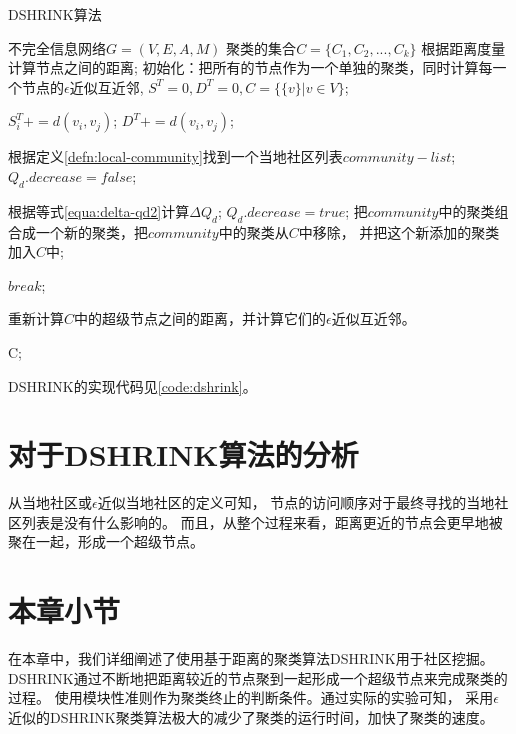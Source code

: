 \begin{algorithm}[htb]
    \caption{DSHRINK算法}
    \label{algo:dshrink}
    \begin{algorithmic}[1]
        \Require
        不完全信息网络$G = (V, E, A, M)$
        \Ensure
        聚类的集合$C = \{C_1, C_2, ..., C_k\}$
        \State 根据距离度量计算节点之间的距离;
        \State 初始化：把所有的节点作为一个单独的聚类，同时计算每一个节点的$\epsilon$近似互近邻,
        $S^T = 0, D^T = 0, C = \{\{v\} | v \in V \}$;

                \State $S_i^T += d(v_i, v_j)$;
                \State $D^T += d(v_i, v_j)$;
            \EndFor
        \EndFor

            \State 根据定义\ref{defn:local-community}找到一个当地社区列表$community-list$;
            \State $Q_d.decrease = false$;

                \State 根据等式\ref{equa:delta-qd2}计算$\Delta Q_d$;
                    \State $Q_d.decrease = true$;
                    \State 把$community$中的聚类组合成一个新的聚类，把$community$中的聚类从$C$中移除，
                    并把这个新添加的聚类加入$C$中;
                \EndIf
            \EndFor

                \State $break$;
            \EndIf

            \State 重新计算$C$中的超级节点之间的距离，并计算它们的$\epsilon$近似互近邻。
        \EndWhile

        \Return C;

    \end{algorithmic}
\end{algorithm}

DSHRINK的实现代码见\ref{code:dshrink}。

\section{对于DSHRINK算法的分析}

从当地社区或$\epsilon$近似当地社区的定义可知，
节点的访问顺序对于最终寻找的当地社区列表是没有什么影响的。
而且，从整个过程来看，距离更近的节点会更早地被聚在一起，形成一个超级节点。

\section{本章小节}

在本章中，我们详细阐述了使用基于距离的聚类算法DSHRINK用于社区挖掘。
DSHRINK通过不断地把距离较近的节点聚到一起形成一个超级节点来完成聚类的过程。
使用模块性准则作为聚类终止的判断条件。通过实际的实验可知，
采用$\epsilon$近似的DSHRINK聚类算法极大的减少了聚类的运行时间，加快了聚类的速度。
